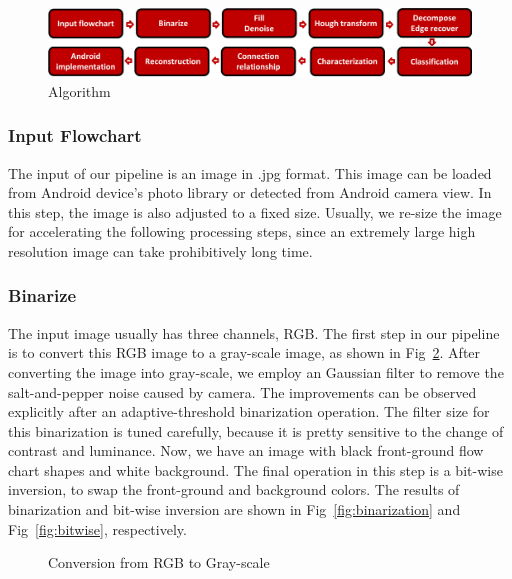 \documentclass[conference,twocolumn]{IEEEtran}
\begin{document}
\begin{figure}
  \center
  \includegraphics[scale=0.3]{Algorithm.png}
  \caption{Algorithm}
  \label{fig: Algorithm}
  \center
\end{figure}


\subsubsection{Input Flowchart}
The input of our pipeline is an image in .jpg format. This image can be loaded from Android device's photo library or detected from Android camera view. In this step, the image is also adjusted to a fixed size. Usually, we re-size the image for accelerating the following processing steps, since an extremely large high resolution image can take prohibitively long time.
        
\subsubsection{Binarize}

The input image usually has three channels, RGB. The first step in our pipeline is to convert this RGB image to a gray-scale image, as shown in Fig~\ref{fig:rgb2gray}. After converting the image into gray-scale, we employ an Gaussian filter to remove the salt-and-pepper noise caused by camera. The improvements can be observed explicitly after an adaptive-threshold binarization operation. The filter size for this binarization is tuned carefully, because it is pretty sensitive to the change of contrast and luminance. Now, we have an image with black front-ground flow chart shapes and white background. The final operation in this step is a bit-wise inversion, to swap the front-ground and background colors. The results of binarization and bit-wise inversion are shown in Fig~\ref{fig:binarization} and Fig~\ref{fig:bitwise}, respectively.

\begin{figure}[!htbp]
    \centering
    \caption{Conversion from RGB to Gray-scale}
    \label{fig:rgb2gray}

\end{figure}
\end{document}
